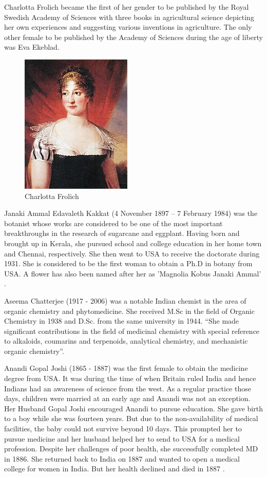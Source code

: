 \documentclass[a4paper,10pt]{article}
\begin{document}
\newblock
Charlotta Frolich became the first of her gender to be published by the Royal Swedish Academy of Sciences with three books in agricultural science depicting her own experiences and suggesting various inventions in agriculture. The only other female to be published by the Academy of Sciences during the age of liberty was Eva Ekeblad\cite{frolich}.

\begin{center}
\begin{figure}[h]
\centering
 \includegraphics[scale=0.7]{charlotta.jpg}
 \caption{Charlotta Frolich}
\end{figure}
\end{center}

\newblock
Janaki Ammal Edavaleth Kakkat (4 November 1897 – 7 February 1984) was the botanist whose works are considered to be one of the most important breakthroughs in the research of sugarcane and eggplant. Having born and brought up in Kerala, she pursued school and college education in her home town and Chennai, respectively. She then went to USA to receive the doctorate during 1931. She is considered to be the first woman to obtain a Ph.D in botany from USA. A flower has also been named after her as 'Magnolia Kobus Janaki Ammal' \cite{janaki}.

\newblock
Aseema Chatterjee (1917 - 2006) was a notable Indian chemist in the area of organic chemistry and phytomedicine. She received M.Sc in the field of Organic Chemistry in 1938 and D.Sc. from the same university in 1944. ``She made significant contributions in the field of medicinal chemistry with special reference to alkaloids, coumarins and terpenoids, analytical chemistry, and mechanistic organic chemistry''.  \cite{chaterjee}


\newblock
Anandi Gopal Joshi (1865 - 1887) was the first female to obtain the medicine degree from USA. It was during the time of when Britain ruled India and hence Indians had an awareness of science from the west. As a regular practice those days, children were married at an early age and Anandi was not an exception. Her Husband Gopal Joshi encouraged Anandi to pursue education. She gave birth to a boy while she was fourteen years. But due to the non-availability of medical facilities, the baby could not survive beyond 10 days. This prompted her to pursue medicine and her husband helped her to send to USA for a medical profession. Despite her challenges of poor health, she successfully completed MD in 1886. She returned back to India on 1887 and wanted to open a medical college for women in India. But her health declined and died in 1887  \cite{joshi}.
\end{document}
